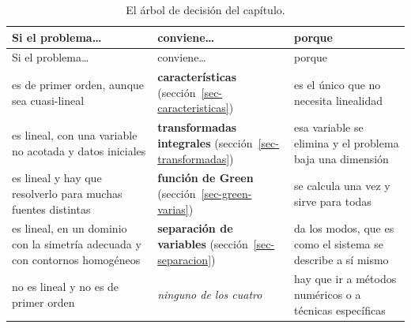 \documentclass[
  spanish,
  a4paper,
]{scrbook}
\theoremstyle{definition}
\theoremstyle{plain}
\theoremstyle{definition}
\theoremstyle{plain}
\theoremstyle{definition}
\theoremstyle{remark}
\begin{document}
\begin{longtable}[]{@{}
  >{\raggedright\arraybackslash}p{}
  >{\raggedright\arraybackslash}p{}
  >{\raggedright\arraybackslash}p{}@{}}
\caption{El árbol de decisión del
capítulo.}\label{tbl-elegir}\tabularnewline
\toprule\noalign{}
\begin{minipage}[b]{\linewidth}\raggedright
Si el problema\ldots{}
\end{minipage} & \begin{minipage}[b]{\linewidth}\raggedright
conviene\ldots{}
\end{minipage} & \begin{minipage}[b]{\linewidth}\raggedright
porque
\end{minipage} \\
\midrule\noalign{}
\endfirsthead
\toprule\noalign{}
\begin{minipage}[b]{\linewidth}\raggedright
Si el problema\ldots{}
\end{minipage} & \begin{minipage}[b]{\linewidth}\raggedright
conviene\ldots{}
\end{minipage} & \begin{minipage}[b]{\linewidth}\raggedright
porque
\end{minipage} \\
\midrule\noalign{}
\endhead
\bottomrule\noalign{}
\endlastfoot
es de primer orden, aunque sea cuasi-lineal & \textbf{características}
(sección~\ref{sec-caracteristicas}) & es el único que no necesita
linealidad \\
es lineal, con una variable no acotada y datos iniciales &
\textbf{transformadas integrales} (sección~\ref{sec-transformadas}) &
esa variable se elimina y el problema baja una dimensión \\
es lineal y hay que resolverlo para muchas fuentes distintas &
\textbf{función de Green} (sección~\ref{sec-green-varias}) & se calcula
una vez y sirve para todas \\
es lineal, en un dominio con la simetría adecuada y con contornos
homogéneos & \textbf{separación de variables}
(sección~\ref{sec-separacion}) & da los modos, que es como el sistema se
describe a sí mismo \\
no es lineal y no es de primer orden & \emph{ninguno de los cuatro} &
hay que ir a métodos numéricos o a técnicas específicas \\
\end{longtable}
\end{document}
